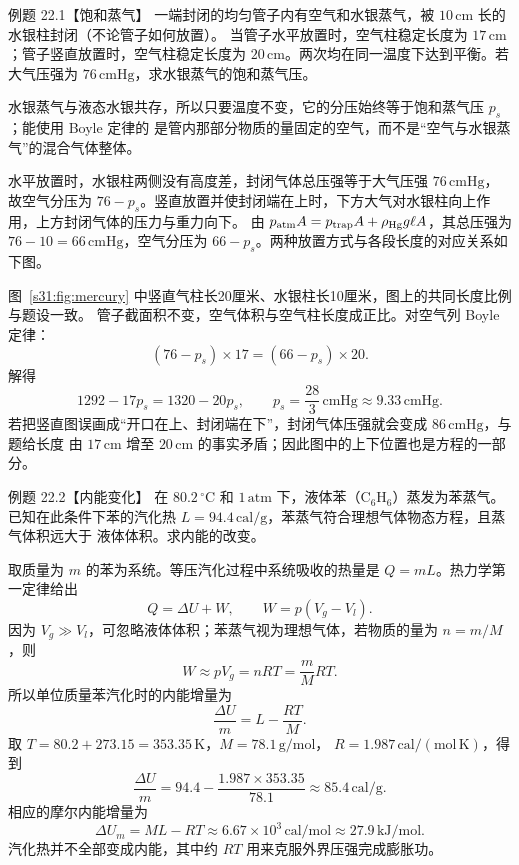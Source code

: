 \begin{origexamplebox}{例题 22.1【饱和蒸气】}
一端封闭的均匀管子内有空气和水银蒸气，被 $10\,\mathrm{cm}$ 长的水银柱封闭（不论管子如何放置）。
当管子水平放置时，空气柱稳定长度为 $17\,\mathrm{cm}$；管子竖直放置时，空气柱稳定长度为
$20\,\mathrm{cm}$。两次均在同一温度下达到平衡。若大气压强为 $76\,\mathrm{cmHg}$，求水银蒸气的饱和蒸气压。
\end{origexamplebox}

\begin{xesolution}
水银蒸气与液态水银共存，所以只要温度不变，它的分压始终等于饱和蒸气压 $p_s$；能使用 Boyle 定律的
是管内那部分物质的量固定的空气，而不是“空气与水银蒸气”的混合气体整体。

水平放置时，水银柱两侧没有高度差，封闭气体总压强等于大气压强 $76\,\mathrm{cmHg}$，故空气分压为
$76-p_s$。竖直放置并使封闭端在上时，下方大气对水银柱向上作用，上方封闭气体的压力与重力向下。
由 $p_{\rm atm}A=p_{\rm trap}A+\rho_{\rm Hg}g\ell A$，其总压强为
$76-10=66\,\mathrm{cmHg}$，空气分压为 $66-p_s$。两种放置方式与各段长度的对应关系如下图。

\mercuryTubeFigure
{}\label{s31:fig:mercury}

图~\ref{s31:fig:mercury} 中竖直气柱长20厘米、水银柱长10厘米，图上的共同长度比例与题设一致。
管子截面积不变，空气体积与空气柱长度成正比。对空气列 Boyle 定律：
\[
  (76-p_s)\times17=(66-p_s)\times20.
\]
解得
\[
  1292-17p_s=1320-20p_s,
  \qquad
  \boxed{p_s=\frac{28}{3}\,\mathrm{cmHg}\approx9.33\,\mathrm{cmHg}}.
\]
若把竖直图误画成“开口在上、封闭端在下”，封闭气体压强就会变成 $86\,\mathrm{cmHg}$，与题给长度
由 $17\,\mathrm{cm}$ 增至 $20\,\mathrm{cm}$ 的事实矛盾；因此图中的上下位置也是方程的一部分。
\end{xesolution}

\begin{origexamplebox}{例题 22.2【内能变化】}
在 $80.2\,{}^{\circ}\mathrm C$ 和 $1\,\mathrm{atm}$ 下，液体苯（$\mathrm{C_6H_6}$）蒸发为苯蒸气。
已知在此条件下苯的汽化热 $L=94.4\,\mathrm{cal/g}$，苯蒸气符合理想气体物态方程，且蒸气体积远大于
液体体积。求内能的改变。
\end{origexamplebox}

\begin{xesolution}
取质量为 $m$ 的苯为系统。等压汽化过程中系统吸收的热量是 $Q=mL$。热力学第一定律给出
\[
  Q=\Delta U+W,
  \qquad W=p(V_g-V_l).
\]
因为 $V_g\gg V_l$，可忽略液体体积；苯蒸气视为理想气体，若物质的量为 $n=m/M$，则
\[
  W\approx pV_g=nRT=\frac{m}{M}RT.
\]
所以单位质量苯汽化时的内能增量为
\[
  \frac{\Delta U}{m}=L-\frac{RT}{M}.
\]
取 $T=80.2+273.15=353.35\,\mathrm K$，$M=78.1\,\mathrm{g/mol}$，
$R=1.987\,\mathrm{cal/(mol\,K)}$，得到
\[
  \boxed{\frac{\Delta U}{m}
  =94.4-\frac{1.987\times353.35}{78.1}
  \approx85.4\,\mathrm{cal/g}}.
\]
相应的摩尔内能增量为
\[
  \boxed{\Delta U_m=ML-RT
  \approx6.67\times10^3\,\mathrm{cal/mol}
  \approx27.9\,\mathrm{kJ/mol}}.
\]
汽化热并不全部变成内能，其中约 $RT$ 用来克服外界压强完成膨胀功。
\end{xesolution}


